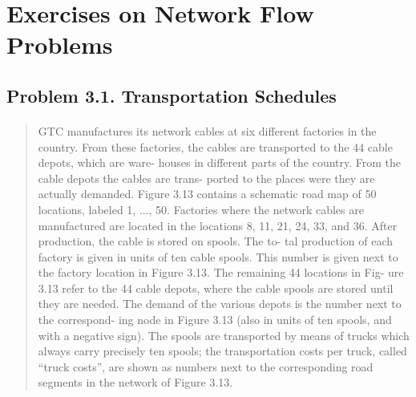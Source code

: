 \section{Exercises on Network Flow Problems}

\subsection{Problem 3.1. Transportation Schedules}

\paragraph{}
\begin{quote}
GTC manufactures its network cables at six different factories in the country. From these factories, the cables are transported to the 44 cable depots, which are ware- houses in different parts of the country. From the cable depots the cables are trans- ported to the places were they are actually demanded.
Figure 3.13 contains a schematic road map of 50 locations, labeled 1, ..., 50. Factories where the network cables are manufactured are located in the locations 8, 11, 21, 24, 33, and 36. After production, the cable is stored on spools. The to- tal production of each factory is given in units of ten cable spools. This number is given next to the factory location in Figure 3.13. The remaining 44 locations in Fig- ure 3.13 refer to the 44 cable depots, where the cable spools are stored until they are needed. The demand of the various depots is the number next to the correspond- ing node in Figure 3.13 (also in units of ten spools, and with a negative sign). The spools are transported by means of trucks which always carry precisely ten spools; the transportation costs per truck, called “truck costs”, are shown as numbers next to the corresponding road segments in the network of Figure 3.13.


\end{quote}
